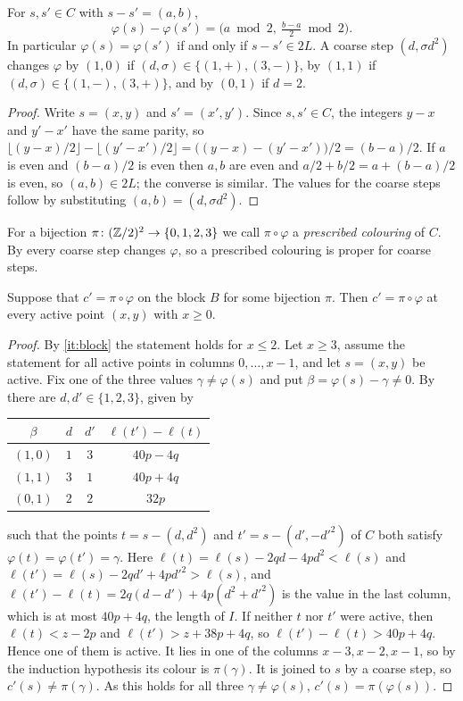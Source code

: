 \documentclass[11pt,colorlinks]{charlie}
\newcommand{\sgn}{\sigma}
\begin{document}
\begin{lemma}\label{lem:phi}
For $s,s'\in C$ with $s-s'=(a,b)$,
\[
\varphi(s)-\varphi(s')=\bigl(a\bmod2,\ \tfrac{b-a}2\bmod2\bigr).
\]
In particular $\varphi(s)=\varphi(s')$ if and only if $s-s'\in2L$. A coarse step $(d,\sgn d^2)$ changes $\varphi$ by $(1,0)$ if $(d,\sgn)\in\{(1,+),(3,-)\}$, by $(1,1)$ if $(d,\sgn)\in\{(1,-),(3,+)\}$, and by $(0,1)$ if $d=2$.
\end{lemma}

\begin{proof}
Write $s=(x,y)$ and $s'=(x',y')$. Since $s,s'\in C$, the integers $y-x$ and $y'-x'$ have the same parity, so $\lfloor(y-x)/2\rfloor-\lfloor(y'-x')/2\rfloor=\bigl((y-x)-(y'-x')\bigr)/2=(b-a)/2$. If $a$ is even and $(b-a)/2$ is even then $a,b$ are even and $a/2+b/2=a+(b-a)/2$ is even, so $(a,b)\in2L$; the converse is similar. The values for the coarse steps follow by substituting $(a,b)=(d,\sgn d^2)$.
\end{proof}

For a bijection $\pi\colon(\mathbb{Z}/2)^2\to\{0,1,2,3\}$ we call $\pi\circ\varphi$ a \emph{prescribed colouring} of $C$. By  every coarse step changes $\varphi$, so a prescribed colouring is proper for coarse steps.

\begin{lemma}[Propagation]\label{lem:propagation}
Suppose that $c'=\pi\circ\varphi$ on the block $B$ for some bijection $\pi$. Then $c'=\pi\circ\varphi$ at every active point $(x,y)$ with $x\ge0$.
\end{lemma}

\begin{proof}
By \ref{it:block} the statement holds for $x\le2$. Let $x\ge3$, assume the statement for all active points in columns $0,\dots,x-1$, and let $s=(x,y)$ be active. Fix one of the three values $\gamma\ne\varphi(s)$ and put $\beta=\varphi(s)-\gamma\ne0$. By  there are $d,d'\in\{1,2,3\}$, given by
\begin{center}
\begin{tabular}{@{}cccc@{}}
\toprule
$\beta$ & $d$ & $d'$ & $\ell(t')-\ell(t)$\\
\midrule
$(1,0)$ & $1$ & $3$ & $40p-4q$\\
$(1,1)$ & $3$ & $1$ & $40p+4q$\\
$(0,1)$ & $2$ & $2$ & $32p$\\
\bottomrule
\end{tabular}
\end{center}
such that the points $t=s-(d,d^2)$ and $t'=s-(d',-d'^2)$ of $C$ both satisfy $\varphi(t)=\varphi(t')=\gamma$. Here $\ell(t)=\ell(s)-2qd-4pd^2<\ell(s)$ and $\ell(t')=\ell(s)-2qd'+4pd'^2>\ell(s)$, and $\ell(t')-\ell(t)=2q(d-d')+4p(d^2+d'^2)$ is the value in the last column, which is at most $40p+4q$, the length of $I$. If neither $t$ nor $t'$ were active, then $\ell(t)<z-2p$ and $\ell(t')>z+38p+4q$, so $\ell(t')-\ell(t)>40p+4q$. Hence one of them is active. It lies in one of the columns $x-3,x-2,x-1$, so by the induction hypothesis its colour is $\pi(\gamma)$. It is joined to $s$ by a coarse step, so $c'(s)\ne\pi(\gamma)$. As this holds for all three $\gamma\ne\varphi(s)$, $c'(s)=\pi(\varphi(s))$.
\end{proof}
\end{document}
